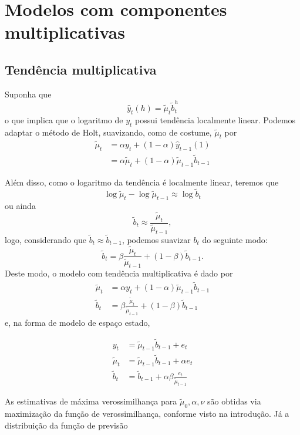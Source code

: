 \documentclass[
  letterpaper,
  DIV=11,
  numbers=noendperiod]{scrreprt}
\theoremstyle{definition}
\theoremstyle{plain}
\theoremstyle{definition}
\theoremstyle{plain}
\theoremstyle{remark}
\begin{document}
\hypertarget{modelos-com-componentes-multiplicativas}{%
\section{Modelos com componentes
multiplicativas}\label{modelos-com-componentes-multiplicativas}}

\hypertarget{tenduxeancia-multiplicativa}{%
\subsection{Tendência
multiplicativa}\label{tenduxeancia-multiplicativa}}

Suponha que \[\hat{y}_t(h)=\tilde{\mu}_t\tilde{b}_t^h\] o que implica
que o logaritmo de \(y_t\) possui tendência localmente linear. Podemos
adaptar o método de Holt, suavizando, como de costume, \(\tilde{\mu}_t\)
por
\[\begin{align}\tilde{\mu}_t&=\alpha y_t+(1-\alpha)\hat{y}_{t-1}(1)\\
&=\alpha\tilde{\mu}_{t}+(1-\alpha)\tilde{\mu}_{t-1}\tilde{b}_{t-1}\end{align}\]

Além disso, como o logaritmo da tendência é localmente linear, teremos
que \[\log \tilde{\mu}_t-\log\tilde{\mu}_{t-1}\approx \log\tilde{b}_t\]
ou ainda \[\tilde{b}_t\approx \frac{\tilde{\mu}_t}{\tilde{\mu}_{t-1}},\]
logo, considerando que \(\tilde{b}_t\approx \tilde{b}_{t-1}\), podemos
suavizar \(b_t\) do seguinte modo:
\[\tilde{b}_t=\beta\frac{\tilde{\mu}_t}{\tilde{\mu}_{t-1}}+(1-\beta)\tilde{b}_{t-1}.\]
Deste modo, o modelo com tendência multiplicativa é dado por
\[\begin{align}
\tilde{\mu}_t&=\alpha y_t+(1-\alpha)\tilde{\mu}_{t-1}\tilde{b}_{t-1}\\
\tilde{b}_t&=\beta\frac{\tilde{\mu}_t}{\tilde{\mu}_{t-1}}+(1-\beta)\tilde{b}_{t-1}
\end{align}\] e, na forma de modelo de espaço estado,

\[\begin{align}
y_t&=\tilde{\mu}_{t-1}\tilde{b}_{t-1}+e_t\\
\tilde{\mu}_t&=\tilde{\mu}_{t-1}\tilde{b}_{t-1}+\alpha e_t\\
\tilde{b}_t&=\tilde{b}_{t-1}+\alpha\beta\frac{e_t}{\tilde{\mu}_{t-1}}
\end{align}\]

As estimativas de máxima verossimilhança para
\(\tilde{\mu}_0,\alpha,\nu\) são obtidas via maximização da função de
verossimilhança, conforme visto na introdução. Já a distribuição da
função de previsão
\end{document}
